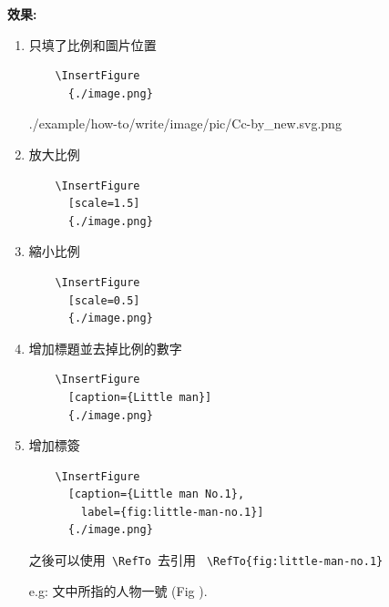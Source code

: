   \newpage
  {\bf 效果:}
  \begin{enumerate}
  \item
  {
    只填了比例和圖片位置
    \begin{verbatim}
    \InsertFigure
      {./image.png}
    \end{verbatim}
    \InsertFigure
      {./example/how-to/write/image/pic/Cc-by_new.svg.png}
  } %

  \item
  {
    放大比例
    \begin{verbatim}
    \InsertFigure
      [scale=1.5]
      {./image.png}
    \end{verbatim}
  } %

  \item
  {
    縮小比例
    \begin{verbatim}
    \InsertFigure
      [scale=0.5]
      {./image.png}
    \end{verbatim}
  } %

  \newpage
  \item
  {
    增加標題並去掉比例的數字
    \begin{verbatim}
    \InsertFigure
      [caption={Little man}]
      {./image.png}
    \end{verbatim}
  } %

  \item
  {
    增加標簽
    \begin{verbatim}
    \InsertFigure
      [caption={Little man No.1},
        label={fig:little-man-no.1}]
      {./image.png}
    \end{verbatim}

    之後可以使用\verb| \RefTo |去引用 \verb| \RefTo{fig:little-man-no.1} |

    e.g: 文中所指的人物一號 (Fig ).
  } %


\end{enumerate}
